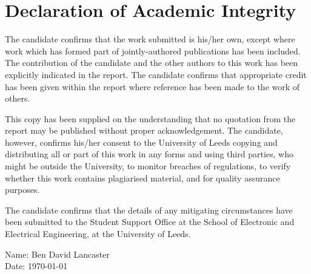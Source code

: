 \documentclass[11pt,a4paper]{report}
\begin{document}


\chapter*{Declaration of Academic Integrity}

The candidate confirms that the work submitted is his/her own, except where work which has formed part of jointly-authored publications has been included. The contribution of the candidate and the other authors to this work has been explicitly indicated in the report. The candidate confirms that appropriate credit has been given within the report where reference has been made to the work of others.

This copy has been supplied on the understanding that no quotation from the report may be published without proper acknowledgement. The candidate, however, confirms his/her consent to the University of Leeds copying and distributing all or part of this work in any forms and using third parties, who might be outside the University, to monitor breaches of regulations, to verify whether this work contains plagiarised material, and for quality assurance purposes.

The candidate confirms that the details of any mitigating circumstances have been submitted to the Student Support Office at the School of Electronic and Electrical Engineering, at the University of Leeds.
\vfill

\noindent 
Name:	Ben David Lancaster \\
Date:	\today
\newpage
\end{document}
